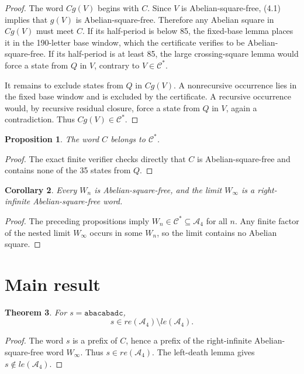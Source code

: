 \documentclass[11pt]{article}
\newtheorem{theorem}{Theorem}[section]
\newtheorem{proposition}[theorem]{Proposition}
\newtheorem{corollary}[theorem]{Corollary}
\theoremstyle{definition}
\newcommand{\A}{\mathcal A_4}
\newcommand{\code}[1]{\texttt{#1}}
\begin{document}
\begin{proof}
The word $Cg(V)$ begins with $C$. Since $V$ is Abelian-square-free, (4.1) implies that $g(V)$ is Abelian-square-free. Therefore any Abelian square in $Cg(V)$ must meet $C$. If its half-period is below 85, the fixed-base lemma places it in the 190-letter base window, which the certificate verifies to be Abelian-square-free. If its half-period is at least 85, the large crossing-square lemma would force a state from $Q$ in $V$, contrary to $V\in\mathcal C^*$.

It remains to exclude states from $Q$ in $Cg(V)$. A nonrecursive occurrence lies in the fixed base window and is excluded by the certificate. A recursive occurrence would, by recursive residual closure, force a state from $Q$ in $V$, again a contradiction. Thus $Cg(V)\in\mathcal C^*$.
\end{proof}

\begin{proposition}
The word $C$ belongs to $\mathcal C^*$.
\end{proposition}

\begin{proof}
The exact finite verifier checks directly that $C$ is Abelian-square-free and contains none of the 35 states from $Q$.
\end{proof}

\begin{corollary}
Every $W_n$ is Abelian-square-free, and the limit $W_\infty$ is a right-infinite Abelian-square-free word.
\end{corollary}

\begin{proof}
The preceding propositions imply $W_n\in\mathcal C^*\subseteq\A$ for all $n$. Any finite factor of the nested limit $W_\infty$ occurs in some $W_n$, so the limit contains no Abelian square.
\end{proof}

\section{Main result}

\begin{theorem}
For $s=\code{abacabadc}$,
\[
\boxed{s\in re(\A)\setminus le(\A)}.
\]
\end{theorem}

\begin{proof}
The word $s$ is a prefix of $C$, hence a prefix of the right-infinite Abelian-square-free word $W_\infty$. Thus $s\in re(\A)$. The left-death lemma gives $s\notin le(\A)$.
\end{proof}
\end{document}
